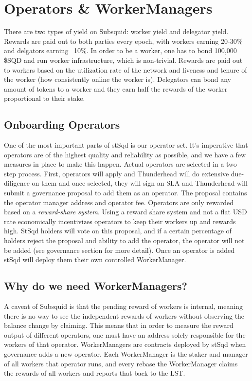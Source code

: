 \documentclass{article}
\begin{document}
\section{Operators \& WorkerManagers}
There are two types of yield on Subsquid: worker yield and delegator yield. Rewards are paid out to both parties every epoch, with workers earning 20-30\% and delgators earning ~10\%. In order to be a worker, one has to bond 100,000 \$SQD and run worker infrastructure, which is non-trivial. Rewards are paid out to workers based on the utilization rate of the network and liveness and tenure of the worker (how consistently online the worker is). Delegators can bond any amount of tokens to a worker and they earn half the rewards of the worker proportional to their stake. 
\subsection{Onboarding Operators}
One of the most important parts of stSqd is our operator set. It's imperative that operators are of the highest quality and reliability as possible, and we have a few measures in place to make this happen. Actual operators are selected in a two step process. First, operators will apply and Thunderhead will do extensive due-diligence on them and once selected, they will sign an SLA and Thunderhead will submit a governance proposal to add them as an operator. The proposal contains the operator manager address and operator fee. Operators are only rewarded based on a \textit{reward-share system}. Using a reward share system and not a flat USD rate economically incentivizes operators to keep their workers up and rewards high. StSqd holders will vote on this proposal, and if a certain percentage of holders reject the proposal and ability to add the operator, the operator will not be added (see governance section for more detail). Once an operator is added stSqd will deploy them their own controlled WorkerManager.
\subsection{Why do we need WorkerManagers?}
A caveat of Subsquid is that the pending reward of workers is internal, meaning there is no way to see the independent rewards of workers without observing the balance change by claiming. This means that in order to measure the reward output of different operators, one must have an address solely responsible for the workers of that operator. WorkerManagers are contracts deployed by stSqd when governance adds a new operator. Each WorkerManager is the staker and manager of all workers that operator runs, and every rebase the WorkerManager claims the rewards of all workers and reports that back to the LST.
\end{document}
